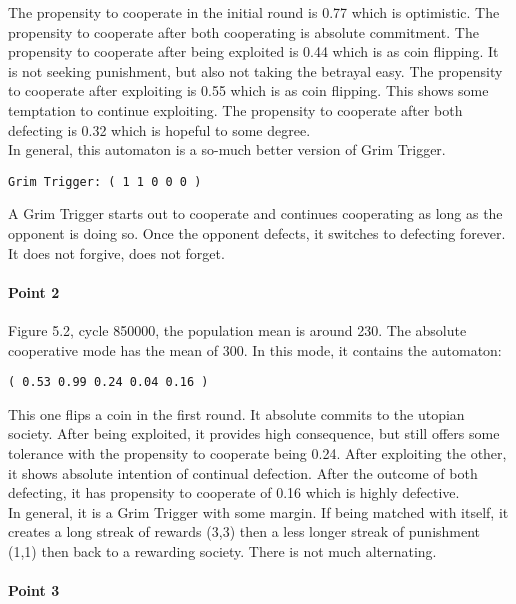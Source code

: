 \documentclass[12.5pt]{report}
\begin{document}
The propensity to cooperate in the initial round is 0.77 which is optimistic. The propensity to cooperate after both cooperating is absolute commitment. The propensity to cooperate after being exploited is 0.44 which is as coin flipping. It is not seeking punishment, but also not taking the betrayal easy. The propensity to cooperate after exploiting is 0.55 which is as coin flipping. This shows some temptation to continue exploiting. The propensity to cooperate after both defecting is 0.32 which is hopeful to some degree.\\

In general, this automaton is a so-much better version of Grim Trigger.

\begin{verbatim}
Grim Trigger: ( 1 1 0 0 0 )
\end{verbatim}

A Grim Trigger starts out to cooperate and continues cooperating as long as the opponent is doing so. Once the opponent defects, it switches to defecting forever. It does not forgive, does not forget.

\paragraph{Point 2}

Figure 5.2, cycle 850000, the population mean is around 230. The absolute cooperative mode has the mean of 300. In this mode, it contains the automaton:
\begin{verbatim}
( 0.53 0.99 0.24 0.04 0.16 )
\end{verbatim}

This one flips a coin in the first round. It absolute commits to the utopian society. After being exploited, it provides high consequence, but still offers some tolerance with the propensity to cooperate being 0.24. After exploiting the other, it shows absolute intention of continual defection. After the outcome of both defecting, it has propensity to cooperate of 0.16 which is highly defective.\\

In general, it is a Grim Trigger with some margin. If being matched with itself, it creates a long streak of rewards (3,3) then a less longer streak of punishment (1,1) then back to a rewarding society. There is not much alternating.

\paragraph{Point 3}
\end{document}
